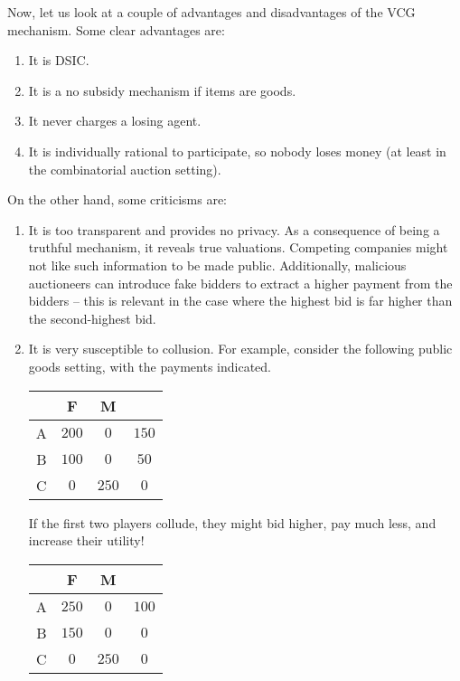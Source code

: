 		Now, let us look at a couple of advantages and disadvantages of the VCG mechanism. Some clear advantages are:
		\begin{enumerate}
			\item It is DSIC.
			\item It is a no subsidy mechanism if items are goods.
			\item It never charges a losing agent.
			\item It is individually rational to participate, so nobody loses money (at least in the combinatorial auction setting).
		\end{enumerate}
		On the other hand, some criticisms are:
		\begin{enumerate}
			\item It is too transparent and provides no privacy. As a consequence of being a truthful mechanism, it reveals true valuations. Competing companies might not like such information to be made public. Additionally, malicious auctioneers can introduce fake bidders to extract a higher payment from the bidders -- this is relevant in the case where the highest bid is far higher than the second-highest bid.
			\item It is very susceptible to collusion. For example, consider the following public goods setting, with the payments indicated.
			\begin{center}
			\begin{tabular}{|c||c|c||c|}
				\hline
				& F & M & \text{payment} \\
				\hline\hline
				A & $200$ & $0$ & $150$ \\
				\hline
				B & $100$ & $0$ & $50$ \\
				\hline
				C & $0$ & $250$ & $0$ \\ \hline
			\end{tabular}
			\end{center}
			If the first two players collude, they might bid higher, pay much less, and increase their utility!
			\begin{center}
			\begin{tabular}{|c||c|c||c|}
				\hline
				& F & M & \text{payment} \\
				\hline\hline
				A & $250$ & $0$ & $100$ \\
				\hline
				B & $150$ & $0$ & $0$ \\
				\hline
				C & $0$ & $250$ & $0$ \\ \hline
			\end{tabular}
			\end{center}

\end{enumerate}
